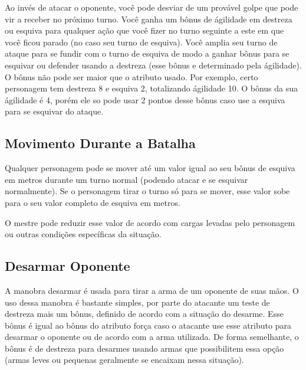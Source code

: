 Ao invés de atacar o oponente, você pode desviar de um provável golpe que pode vir a receber no próximo turno. Você ganha um bônus de ágilidade em destreza ou esquiva para qualquer ação que você fizer no turno seguinte a este em que você ficou parado (no caso seu turno de esquiva). Você amplia seu turno de ataque para se fundir com o turno de esquiva de modo a ganhar bônus para se esquivar ou defender usando a destreza (esse bônus e determinado pela ágilidade). O bônus não pode ser maior que o atributo usado. Por exemplo, certo personagem tem destreza 8 e esquiva 2, totalizando ágilidade 10. O bônus da sua ágilidade é 4, porém ele so pode usar 2 pontos desse bônus caso use a esquiva para se esquivar do ataque.


\subsection{Movimento Durante a Batalha}

Qualquer personagem pode se mover até um valor igual ao seu bônus de esquiva em metros durante um turno normal (podendo atacar e se esquivar normalmente). Se o personagem tirar o turno só para se mover, esse valor sobe para o seu valor completo de esquiva em metros.

O mestre pode reduzir esse valor de acordo com cargas levadas pelo personagem ou outras condições específicas da situação.
	
	
\subsection{Desarmar Oponente}

A manobra desarmar é usada para tirar a arma de um oponente de suas mãos. O uso dessa manobra é bastante simples, por parte do atacante um teste de destreza mais um bônus, definido de acordo com a situação do desarme. Esse bônus é igual ao bônus do atributo força caso o atacante use esse atributo para desarmar o oponente ou de acordo com a arma utilizada. De forma semelhante, o bônus é de destreza para desarmes usando armas que possibilitem essa opção (armas leves ou pequenas geralmente se encaixam nessa situação).

